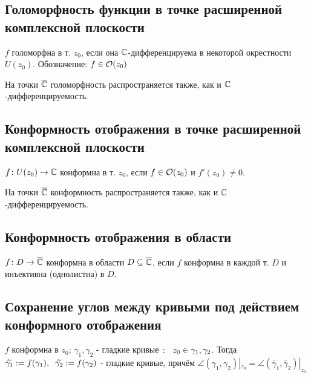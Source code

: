 \subsection{Голоморфность функции в точке расширенной комплексной плоскости}
\begin{definition}
  $f$ голоморфна в т. $z_0$, если она $\mathbb{C}$-дифференцируема в некоторой окрестности $U(z_0)$. Обозначение: $f\in\mathcal{O}(z_0)$
\end{definition}
На точки $\overline{\mathbb{C}}$ голоморфность распространяется также, как и $\mathbb{C}$-дифференцируемость. 
\subsection{Конформность отображения в точке расширенной комплексной плоскости}
\begin{definition}
  $f\colon U(z_0)\to\mathbb{C}$ конформна в т. $z_0$, если $f\in \mathcal{O}(z_0)$ и $f'(z_0)\neq 0$. 
\end{definition}
На точки $\overline{\mathbb{C}}$ конформность распространяется также, как и $\mathbb{C}$-дифференцируемость.
\subsection{Конформность отображения в области}
\begin{definition}
  $f\colon D\to\overline{\mathbb{C}}$ конформна в области $D\subseteq \overline{\mathbb{C}}$, если $f$ конформна в каждой т. $D$ и инъективна (однолистна) в $D$.
\end{definition}
\subsection{Сохранение углов между кривыми под действием конформного отображения}
\begin{theorem}
  $f$ конформна в $z_0$; $\gamma_1,\gamma_2$ - гладкие кривые $\colon\hspace{0.2cm} z_0\in \gamma_1,\gamma_2$. Тогда $\widetilde{\gamma_1}:=f(\gamma_1),\hspace{0.2cm} \widetilde{\gamma_2}:=f(\gamma_2)$ - гладкие кривые, причём $\angle(\gamma_1,\gamma_2)|_{z_0} = \angle(\widetilde{\gamma_1},\widetilde{\gamma_2})|_{z_0}$ 
\end{theorem}
